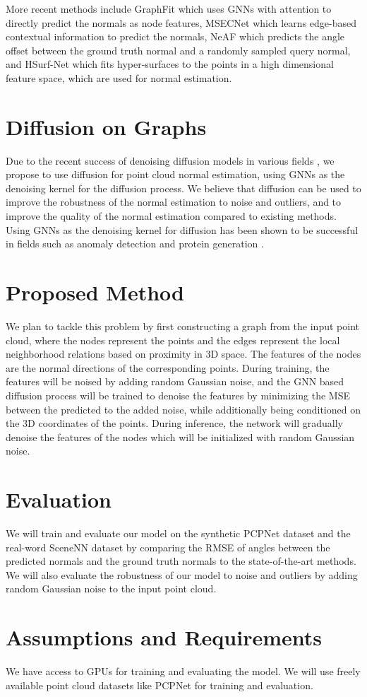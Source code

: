 \documentclass{article}
\begin{document}
More recent methods include GraphFit \cite{li2022graphfit} which uses GNNs with attention to directly predict the normals as node features, MSECNet \cite{xiu2023msecnet} which learns edge-based contextual information to predict the normals, NeAF \cite{li2023neaf} which predicts the angle offset between the ground truth normal and a randomly sampled query normal, and HSurf-Net \cite{li2022hsurf} which fits hyper-surfaces to the points in a high dimensional feature space, which are used for normal estimation.


\section{Diffusion on Graphs}
Due to the recent success of denoising diffusion models \cite{ho2020denoising} in various fields \cite{cao2024survey,yang2023diffusion}, we propose to use diffusion for point cloud normal estimation, using GNNs as the denoising kernel for the diffusion process. We believe that diffusion can be used to improve the robustness of the normal estimation to noise and outliers, and to improve the quality of the normal estimation compared to existing methods. Using GNNs as the denoising kernel for diffusion has been shown to be successful in fields such as anomaly detection \cite{ConGNN_2024} and protein generation \cite{ingraham2023illuminating}.

\section{Proposed Method}
We plan to tackle this problem by first constructing a graph from the input point cloud, where the nodes represent the points and the edges represent the local neighborhood relations based on proximity in 3D space.
The features of the nodes are the normal directions of the corresponding points. During training, the features will be noised by adding random Gaussian noise, and the GNN based diffusion process will be trained to denoise the features by minimizing the MSE between the predicted to the added noise, while additionally being conditioned on the 3D coordinates of the points. During inference, the network will gradually denoise the features of the nodes which will be initialized with random Gaussian noise.

\section{Evaluation}
We will train and evaluate our model on the synthetic PCPNet dataset \cite{guerrero2018pcpnet} and the real-word SceneNN dataset \cite{scenenn-3dv16} by comparing the RMSE of angles between the predicted normals and the ground truth normals to the state-of-the-art methods. We will also evaluate the robustness of our model to noise and outliers by adding random Gaussian noise to the input point cloud.

\section{Assumptions and Requirements}
We have access to GPUs for training and evaluating the model. We will use freely available point cloud datasets like PCPNet for training and evaluation.

\printbibliography
\end{document}
